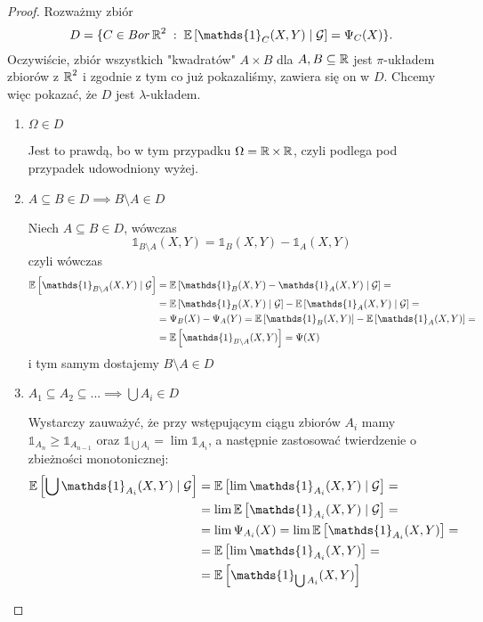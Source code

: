 \begin{proof}
  Rozważmy zbiór
  $$D=\{C\in Bor\R^2\;:\;\expected{\mathds{1}_C(X,Y)}{\set{G}}=\Psi_C(X)  \}.$$
  Oczywiście, zbiór wszystkich "kwadratów" $A\times B$ dla $A,B\subseteq\operatorname{\mathbb{R}}$ jest $\pi$-układem zbiorów z $\operatorname{\mathbb{R}}^2$ i zgodnie z tym co już pokazaliśmy, zawiera się on w $D$. Chcemy więc pokazać, że $D$ jest $\lambda$-układem.

  \begin{enumerate}
    \item $\Omega\in D$
      
      Jest to prawdą, bo w tym przypadku $\Omega=\operatorname{\mathbb{R}}\times\operatorname{\mathbb{R}}$, czyli podlega pod przypadek udowodniony wyżej.

    \item $A\subseteq B\in D\implies B\setminus A\in D$

      Niech $A\subseteq B\in D$, wówczas
      $$\mathds{1}_{B\setminus A}(X, Y)=\mathds{1}_B(X, Y)-\mathds{1}_A(X, Y)$$
      czyli wówczas
      \begin{align*}
        \expected{\mathds{1}_{B\setminus A}(X, Y)}{\set{G}}&=\expected{\mathds{1}_B(X, Y)-\mathds{1}_A(X, Y)}{\set{G}}=\\ 
                                                           &=\expected{\mathds{1}_B(X, Y)}{\set{G}}-\expected{\mathds{1}_A(X, Y)}{\set{G}}=\\ 
                                                           &=\Psi_B(X)-\Psi_A(Y)=\expected{\mathds{1}_B(X, Y)}-\expected{\mathds{1}_A(X, Y)}=\\ 
                                                           &=\expected{\mathds{1}_{B\setminus A}(X, Y)}=\Psi(X)
      \end{align*}
      i tym samym dostajemy $B\setminus A\in D$
    \item $A_1\subseteq A_2\subseteq...\implies\bigcup A_i\in D$

      Wystarczy zauważyć, że przy wstępującym ciągu zbiorów $A_i$ mamy $\mathds{1}_{A_n}\geq \mathds{1}_{A_{n-1}}$ oraz $\mathds{1}_{\bigcup A_i}=\lim\mathds{1}_{A_i}$, a następnie zastosować twierdzenie o zbieżności monotonicznej:
      \begin{align*}
        \expected{\bigcup \mathds{1}_{A_i}(X, Y)}{\set{G}}&=\expected{\lim\mathds{1}_{A_i}(X, Y)}{\set{G}}=\\ 
                                                          &=\lim\expected{\mathds{1}_{A_i}(X, Y)}{\set{G}}=\\ 
                                                          &=\lim\Psi_{A_i}(X)=\lim\expected{\mathds{1}_{A_i}(X, Y)}=\\ 
                                                          &= \expected{\lim\mathds{1}_{A_i}(X, Y)}=\\ 
                                                          &=\expected{\mathds{1}_{\bigcup A_i}(X, Y)}
      \end{align*}
  \end{enumerate}


\end{proof}
